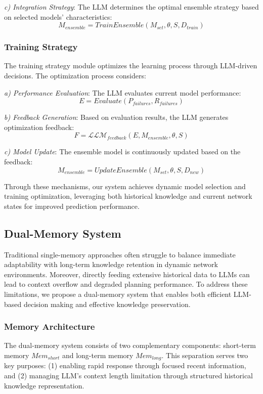 \documentclass[conference]{IEEEtran}
\begin{document}
\textit{c) Integration Strategy}: The LLM determines the optimal ensemble strategy based on selected models' characteristics:
\begin{equation}
    M_{ensemble} = TrainEnsemble(M_{set}, \theta, S, D_{train})
\end{equation}

\subsubsection{Training Strategy}
The training strategy module optimizes the learning process through LLM-driven decisions. The optimization process considers:

\textit{a) Performance Evaluation}: The LLM evaluates current model performance:
\begin{equation}
    E = Evaluate(P_{failures}, R_{failures})
\end{equation}

\textit{b) Feedback Generation}: Based on evaluation results, the LLM generates optimization feedback:
\begin{equation}
    F = \mathcal{LLM}_{feedback}(E, M_{ensemble}, \theta, S)
\end{equation}

\textit{c) Model Update}: The ensemble model is continuously updated based on the feedback:
\begin{equation}
    M_{ensemble} = UpdateEnsemble(M_{set}, \theta, S, D_{new})
\end{equation}

Through these mechanisms, our system achieves dynamic model selection and training optimization, leveraging both historical knowledge and current network states for improved prediction performance.

\subsection{Dual-Memory System}
Traditional single-memory approaches often struggle to balance immediate adaptability with long-term knowledge retention in dynamic network environments. Moreover, directly feeding extensive historical data to LLMs can lead to context overflow and degraded planning performance. To address these limitations, we propose a dual-memory system that enables both efficient LLM-based decision making and effective knowledge preservation.

\subsubsection{Memory Architecture}
The dual-memory system consists of two complementary components: short-term memory $Mem_{short}$ and long-term memory $Mem_{long}$. This separation serves two key purposes: (1) enabling rapid response through focused recent information, and (2) managing LLM's context length limitation through structured historical knowledge representation.
\end{document}
